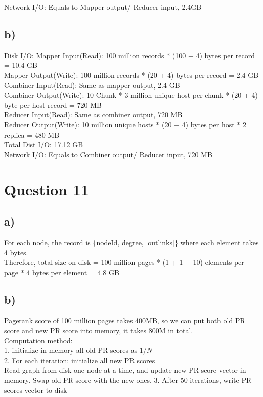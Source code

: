 \documentclass{article}
\begin{document}
Network I/O:
Equals to Mapper output/ Reducer input, 2.4GB

\subsection{b)}
Disk I/O: 
Mapper Input(Read): 100 million records * (100 + 4) bytes per record = 10.4 GB \\
Mapper Output(Write): 100 million records * (20 + 4) bytes per record = 2.4 GB \\
Combiner Input(Read): Same as mapper output, 2.4 GB \\
Combiner Output(Write): 10 Chunk * 3 million unique host per chunk * (20 + 4) byte per host record = 720 MB \\
Reducer Input(Read): Same as combiner output, 720 MB \\
Reducer Output(Write): 10 million unique hosts *  (20 + 4) bytes per host * 2 replica 
= 480 MB \\
Total Dist I/O: 17.12 GB \\

Network I/O:
Equals to Combiner output/ Reducer input, 720 MB

\section{Question 11}
\subsection{a)}
For each node, the record is \{nodeId, degree, [outlinks]\} where each element takes 4 bytes. \\
Therefore, total size on disk = 100 million pages * (1 + 1 + 10) elements per page * 4 bytes per element = 4.8 GB \\

\subsection{b)}
Pagerank score of 100 million pages takes 400MB, so we can put both old PR score and new PR score into memory, it takes 800M in total. \\
Computation method: \\
1.  initialize in memory all old PR scores as $1/N$ \\
2.  For each iteration:
      initialize all new PR scores \\
      Read graph from disk one node at a time, and update new PR score vector in memory.
      Swap old PR score with the new ones.
3. After 50 iterations, write PR scores vector to disk
\end{document}
